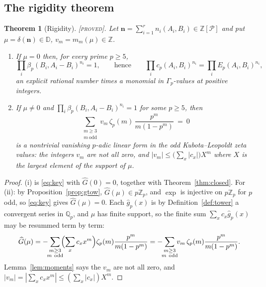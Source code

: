 \documentclass[11pt,reqno]{article}
\newcommand{\Qp}{\mathbb{Q}_p}
\newcommand{\Zp}{\mathbb{Z}_p}
\newcommand{\ZZ}{\mathbb{Z}}
\newcommand{\Gp}{\Gamma_p}
\newcommand{\gh}{\widehat{g}_p}
\newcommand{\bet}{\beta_p}
\newcommand{\Pset}{\mathcal{P}}
\newcommand{\Div}{\mathbb{D}}
\newcommand{\PROVED}{{\normalfont\textsc{[proved]}}}
\theoremstyle{plain}
\newtheorem{theorem}{Theorem}[section]
\theoremstyle{definition}
\theoremstyle{remark}
\numberwithin{equation}{section}
\begin{document}
\subsection{The rigidity theorem}

\begin{theorem}[Rigidity]\label{thm:rigid}
\PROVED.  Let $\mathbf n=\sum_{i=1}^{r}n_i(A_i,B_i)\in\ZZ[\Pset]$ and put
$\mu=\delta(\mathbf n)\in\Div$, $v_m=m_m(\mu)\in\ZZ$.
\begin{enumerate}[label=(\roman*),leftmargin=2em]
\item If $\mu=0$ then, for \emph{every} prime $p\ge5$,
  \[
    \prod_i\bet(B_i,A_i-B_i)^{n_i}=1,
    \qquad\text{hence}\qquad
    \prod_ic_p(A_i,B_i)^{n_i}=\prod_iE_p(A_i,B_i)^{n_i},
  \]
  an explicit rational number times a monomial in $\Gp$-values at positive
  integers.
\item If $\mu\ne0$ and $\prod_i\bet(B_i,A_i-B_i)^{n_i}=1$ for some $p\ge5$, then
  \begin{equation}\label{eq:forced}
    \sum_{\substack{m\ge3\\ m\ \mathrm{odd}}}
      v_m\,\zeta_p(m)\,\frac{p^m}{m(1-p^m)}\ =\ 0
  \end{equation}
  is a nontrivial vanishing $p$-adic linear form in the odd Kubota--Leopoldt
  zeta values: the integers $v_m$ are not all zero, and
  $|v_m|\le\bigl(\sum_x|c_x|\bigr)X^m$ where $X$ is the largest element of the
  support of $\mu$.
\end{enumerate}
\end{theorem}

\begin{proof}
(i) is \eqref{eq:key} with $\widehat G(0)=0$, together with
Theorem~\ref{thm:closed}.  For (ii): by Proposition~\ref{prop:gtow},
$\widehat G(\mu)\in p\Zp$, and $\exp$ is injective on $p\Zp$ for $p$ odd, so
\eqref{eq:key} gives $\widehat G(\mu)=0$.  Each $\gh(x)$ is by
Definition~\ref{def:tower} a convergent series in $\Qp$, and $\mu$ has finite
support, so the finite sum $\sum_xc_x\gh(x)$ may be resummed term by term:
\[
  \widehat G(\mu)
  =-\!\!\sum_{\substack{m\ge3\\ m\ \mathrm{odd}}}\!\!
     \Bigl(\sum_xc_xx^m\Bigr)\zeta_p(m)\frac{p^m}{m(1-p^m)}
  =-\!\!\sum_{\substack{m\ge3\\ m\ \mathrm{odd}}}\!\!
     v_m\,\zeta_p(m)\frac{p^m}{m(1-p^m)} .
\]
Lemma~\ref{lem:moments} says the $v_m$ are not all zero, and
$|v_m|=|\sum_xc_xx^m|\le(\sum_x|c_x|)X^m$.
\end{proof}
\end{document}
